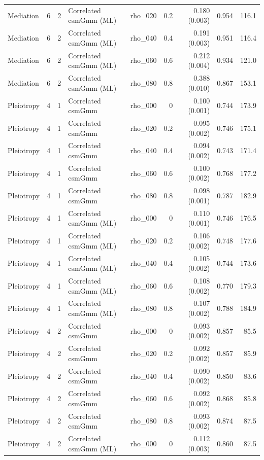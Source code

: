 \begin{longtable}{lcclrrrrr}
Mediation & 6 & 2 & Correlated csmGmm (ML) & rho\_020 & 0.2 & 0.180 (0.003) & 0.954 & 116.1\\
Mediation & 6 & 2 & Correlated csmGmm (ML) & rho\_040 & 0.4 & 0.191 (0.003) & 0.951 & 116.4\\
Mediation & 6 & 2 & Correlated csmGmm (ML) & rho\_060 & 0.6 & 0.212 (0.004) & 0.934 & 121.0\\
Mediation & 6 & 2 & Correlated csmGmm (ML) & rho\_080 & 0.8 & 0.388 (0.010) & 0.867 & 153.1\\
Pleiotropy & 4 & 1 & Correlated csmGmm & rho\_000 & 0 & 0.100 (0.001) & 0.744 & 173.9\\
Pleiotropy & 4 & 1 & Correlated csmGmm & rho\_020 & 0.2 & 0.095 (0.002) & 0.746 & 175.1\\
Pleiotropy & 4 & 1 & Correlated csmGmm & rho\_040 & 0.4 & 0.094 (0.002) & 0.743 & 171.4\\
Pleiotropy & 4 & 1 & Correlated csmGmm & rho\_060 & 0.6 & 0.100 (0.002) & 0.768 & 177.2\\
Pleiotropy & 4 & 1 & Correlated csmGmm & rho\_080 & 0.8 & 0.098 (0.001) & 0.787 & 182.9\\
Pleiotropy & 4 & 1 & Correlated csmGmm (ML) & rho\_000 & 0 & 0.110 (0.001) & 0.746 & 176.5\\
Pleiotropy & 4 & 1 & Correlated csmGmm (ML) & rho\_020 & 0.2 & 0.106 (0.002) & 0.748 & 177.6\\
Pleiotropy & 4 & 1 & Correlated csmGmm (ML) & rho\_040 & 0.4 & 0.105 (0.002) & 0.744 & 173.6\\
Pleiotropy & 4 & 1 & Correlated csmGmm (ML) & rho\_060 & 0.6 & 0.108 (0.002) & 0.770 & 179.3\\
Pleiotropy & 4 & 1 & Correlated csmGmm (ML) & rho\_080 & 0.8 & 0.107 (0.002) & 0.788 & 184.9\\
Pleiotropy & 4 & 2 & Correlated csmGmm & rho\_000 & 0 & 0.093 (0.002) & 0.857 & 85.5\\
Pleiotropy & 4 & 2 & Correlated csmGmm & rho\_020 & 0.2 & 0.092 (0.002) & 0.857 & 85.9\\
Pleiotropy & 4 & 2 & Correlated csmGmm & rho\_040 & 0.4 & 0.090 (0.002) & 0.850 & 83.6\\
Pleiotropy & 4 & 2 & Correlated csmGmm & rho\_060 & 0.6 & 0.092 (0.002) & 0.868 & 85.8\\
Pleiotropy & 4 & 2 & Correlated csmGmm & rho\_080 & 0.8 & 0.093 (0.002) & 0.874 & 87.5\\
Pleiotropy & 4 & 2 & Correlated csmGmm (ML) & rho\_000 & 0 & 0.112 (0.003) & 0.860 & 87.5\\

\end{longtable}
